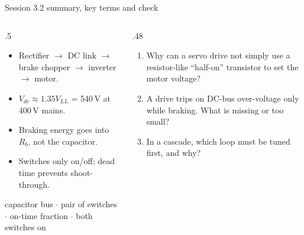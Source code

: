\documentclass[aspectratio=169,10pt]{beamer}
\begin{document}
\begin{frame}{Session 3.2 summary, key terms and check}
\begin{columns}[T]
\begin{column}{.5\textwidth}
\begin{keybox}
\begin{itemize}\setlength\itemsep{.3mm}
\item Rectifier $\to$ DC link $\to$ brake chopper $\to$ inverter $\to$ motor.
\item $V_{dc}\approx1.35V_{LL}$ = 540\,V at 400\,V mains.
\item Braking energy goes into $R_b$, not the capacitor.
\item Switches only on/off; dead time prevents shoot-through.
\end{itemize}
\end{keybox}
\begin{defbox}
\small
{} capacitor bus $\cdot$  pair of switches $\cdot$  on-time fraction $\cdot$  both switches on
\end{defbox}
\end{column}
\begin{column}{.48\textwidth}
\begin{keybox}
\begin{enumerate}\setlength\itemsep{1.5mm}
\item Why can a servo drive not simply use a resistor-like ``half-on'' transistor to set the motor voltage?
\item A drive trips on DC-bus over-voltage only while braking. What is missing or too small?
\item In a cascade, which loop must be tuned first, and why?
\end{enumerate}
\end{keybox}
\end{column}
\end{columns}
\end{frame}

\end{document}
